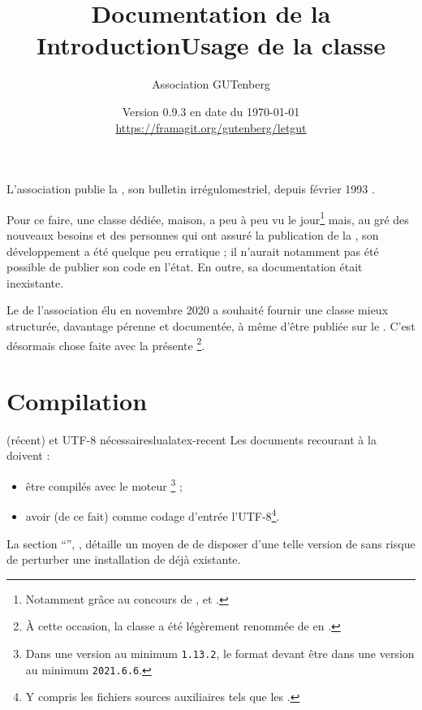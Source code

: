 \documentclass{letgut}
\title{%
  Documentation de la
  \texorpdfstring{%
    \letgutcls%
  }{%
    classe letgut%
  }%
}
\author{Association GUTenberg}
\date{%
  Version 0.9.3 en date du \today%
  \texorpdfstring{%
    \\
    \url{https://framagit.org/gutenberg/letgut}%
  }{%
  }%
}
\begin{document}

\title{Introduction}
\label{sec:introduction}
L'association \gutenberg{} publie la , son bulletin irrégulomestriel,
depuis février 1993 \autocite{AssociationGUTenbergLettreGUTenberg}.

Pour ce faire, une classe  dédiée, maison, a peu à peu vu le
jour\footnote{Notamment grâce au concours de ,
   et .} mais, au gré des
nouveaux besoins et des personnes qui ont assuré la publication de la ,
son développement a été quelque peu erratique ; il n'aurait notamment pas été
possible de publier son code en l'état. En outre, sa documentation était
inexistante.

Le \ca{} de l'association élu en novembre 2020 a souhaité fournir une classe
mieux structurée, davantage pérenne et documentée, à même d'être publiée sur le
\ctan{}. C'est désormais chose faite avec la présente \footnote{À
  cette occasion, la classe a été légèrement renommée de  en
  .}.

\title{Usage de la classe }
\label{sec:usage-de-la}

\section{Compilation}
\label{sec:compilation}

\begin{dbwarning}{ (récent) et UTF-8 nécessaires}{lualatex-recent}
  Les documents recourant à la  doivent :
  \begin{itemize}
  \item être compilés avec le moteur \footnote{Dans une version
      au minimum \texttt{1.13.2}, le format  devant être dans
      une version au minimum \texttt{2021.6.6}.} ;
  \item avoir (de ce fait) comme codage d'entrée l'UTF-8\footnote{Y compris les
      fichiers sources auxiliaires tels que les .}.
  \end{itemize}
\end{dbwarning}

La section \enquote{}, ,
détaille un moyen de de disposer d'une telle version de  sans
risque de perturber une installation de  déjà existante.
\end{document}
